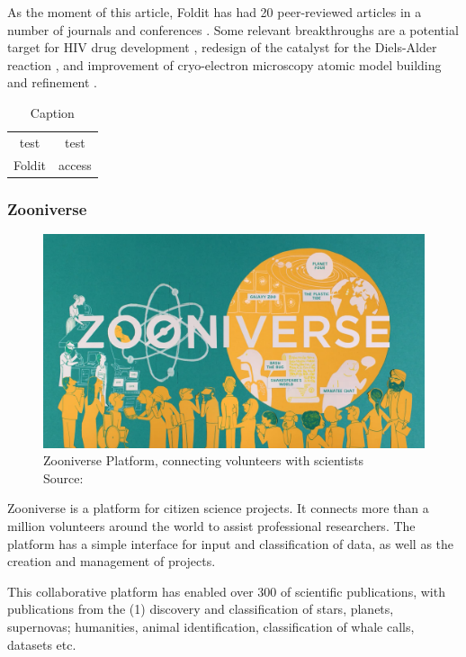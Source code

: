 As the moment of this article, Foldit has had 20 peer-reviewed articles in a number of journals and conferences \cite{foldit-publications}. Some relevant breakthroughs are a potential target for HIV drug development \cite{khatib2011crystal}, redesign of the catalyst for the Diels-Alder reaction \cite{eiben2012increased}, and improvement of cryo-electron microscopy atomic model building and refinement \cite{khatib2019building}.

\begin{table}[h]
    \centering
    \begin{tabular}{c|c}
        test & test \\
        Foldit & access
    \end{tabular}
    \caption{Caption}
    \label{tab:my_label}
\end{table}

\subsubsection{Zooniverse}

\begin{figure}[ht]
    \centering
    \includegraphics[width=\linewidth]{images/background/zooniverse.jpg}
    \caption{Zooniverse Platform, connecting volunteers with scientists \\ Source: \cite{zooniverse-logo}}
    \label{fig:foldit-solution}
\end{figure}

Zooniverse is a platform for citizen science projects. It connects more than a million volunteers around the world to assist professional researchers. The platform has a simple interface for input and classification of data, as well as the creation and management of projects.

This collaborative platform has enabled over 300 of scientific publications, with publications from the (1) discovery and classification of stars, planets, supernovas; humanities, animal identification, classification of whale calls, datasets etc.

